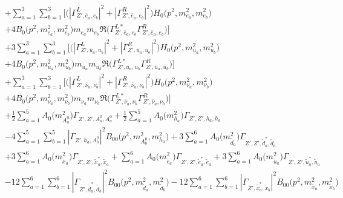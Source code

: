 \begin{itemize}
\begin{align}
 &+\sum_{a=1}^{3}\sum_{b=1}^{3} \Big[\Big(|{\Gamma^L_{{Z'},\bar{e}_{{a}},e_{{b}}}}|^2 + |{\Gamma^R_{{Z'},\bar{e}_{{a}},e_{{b}}}}|^2\Big){H_0\Big(p^{2},m^2_{e_{{a}}},m^2_{e_{{b}}}\Big)} \nonumber \\ & +4 {B_0\Big(p^{2},m^2_{e_{{a}}},m^2_{e_{{b}}}\Big)} m_{e_{{a}}} m_{e_{{b}}} {\Re\Big({\Gamma^{L*}_{{Z'},\bar{e}_{{a}},e_{{b}}}} {\Gamma^R_{{Z'},\bar{e}_{{a}},e_{{b}}}} \Big)} \Big]\nonumber \\ 
 &+3 \sum_{a=1}^{3}\sum_{b=1}^{3} \Big[\Big(|{\Gamma^L_{{Z'},\bar{u}_{{a}},u_{{b}}}}|^2 + |{\Gamma^R_{{Z'},\bar{u}_{{a}},u_{{b}}}}|^2\Big){H_0\Big(p^{2},m^2_{u_{{a}}},m^2_{u_{{b}}}\Big)} \nonumber \\ & +4 {B_0\Big(p^{2},m^2_{u_{{a}}},m^2_{u_{{b}}}\Big)} m_{u_{{a}}} m_{u_{{b}}} {\Re\Big({\Gamma^{L*}_{{Z'},\bar{u}_{{a}},u_{{b}}}} {\Gamma^R_{{Z'},\bar{u}_{{a}},u_{{b}}}} \Big)} \Big] \nonumber \\ 
 &+\sum_{a=1}^{3}\sum_{b=1}^{3} \Big[\Big(|{\Gamma^L_{{Z'},\bar{\nu}_{{a}},\nu_{{b}}}}|^2 + |{\Gamma^R_{{Z'},\bar{\nu}_{{a}},\nu_{{b}}}}|^2\Big){H_0\Big(p^{2},m^2_{\nu_{{a}}},m^2_{\nu_{{b}}}\Big)} \nonumber \\ & +4 {B_0\Big(p^{2},m^2_{\nu_{{a}}},m^2_{\nu_{{b}}}\Big)} m_{\nu_{{a}}} m_{\nu_{{b}}} {\Re\Big({\Gamma^{L*}_{{Z'},\bar{\nu}_{{a}},\nu_{{b}}}} {\Gamma^R_{{Z'},\bar{\nu}_{{a}},\nu_{{b}}}} \Big)} \Big]\nonumber \\ 
 &+\frac{1}{2} \sum_{a=1}^{5}{A_0\Big(m^2_{A^0_{{a}}}\Big)} {\Gamma_{{Z'},{Z'},A^0_{{a}},A^0_{{a}}}}  +\frac{1}{2} \sum_{a=1}^{5}{A_0\Big(m^2_{h_{{a}}}\Big)} {\Gamma_{{Z'},{Z'},h_{{a}},h_{{a}}}}  \nonumber \\ 
 &-4 \sum_{a=1}^{5}\sum_{b=1}^{5}|{\Gamma_{{Z'},h_{{a}},A^0_{{b}}}}|^2 {B_{00}\Big(p^{2},m^2_{A^0_{{b}}},m^2_{h_{{a}}}\Big)}  +3 \sum_{a=1}^{6}{A_0\Big(m^2_{\tilde{d}_{{a}}}\Big)} {\Gamma_{{Z'},{Z'},\tilde{d}^*_{{a}},\tilde{d}_{{a}}}}  \nonumber \\ 
 &+3 \sum_{a=1}^{6}{A_0\Big(m^2_{\tilde{x}_{{a}}}\Big)} {\Gamma_{{Z'},{Z'},\tilde{x}^*_{{a}},\tilde{x}_{{a}}}}  +\sum_{a=1}^{6}{A_0\Big(m^2_{\tilde{e}_{{a}}}\Big)} {\Gamma_{{Z'},{Z'},\tilde{e}^*_{{a}},\tilde{e}_{{a}}}} +3 \sum_{a=1}^{6}{A_0\Big(m^2_{\tilde{u}_{{a}}}\Big)} {\Gamma_{{Z'},{Z'},\tilde{u}^*_{{a}},\tilde{u}_{{a}}}}  \nonumber \\ 
 &-12 \sum_{a=1}^{6}\sum_{b=1}^{6}|{\Gamma_{{Z'},\tilde{d}^*_{{a}},\tilde{d}_{{b}}}}|^2 {B_{00}\Big(p^{2},m^2_{\tilde{d}_{{a}}},m^2_{\tilde{d}_{{b}}}\Big)}  -12 \sum_{a=1}^{6}\sum_{b=1}^{6}|{\Gamma_{{Z'},\tilde{x}^*_{{a}},\tilde{x}_{{b}}}}|^2 {B_{00}\Big(p^{2},m^2_{\tilde{x}_{{a}}},m^2_{\tilde{x}_{{b}}}\Big)}  \nonumber \\ 

\end{align}
\end{itemize}
